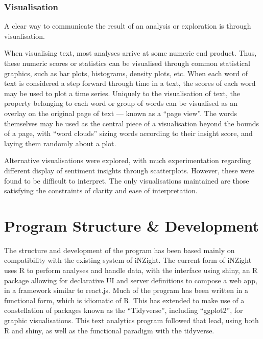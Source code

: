 \documentclass[11pt, a4paper, twoside, titlepage]{report}
\begin{document}
\subsection{Visualisation}\label{sec:visualisation-1}

A clear way to communicate the result of an analysis or exploration is
through visualisation.

When visualising text, most analyses arrive at some numeric end
product. Thus, these numeric scores or statistics can be visualised
through common statistical graphics, such as bar plots, histograms,
density plots, etc. When each word of text is considered a step
forward through time in a text, the scores of each word may be used to
plot a time series. Uniquely to the visualisation of text, the
property belonging to each word or group of words can be visualised as
an overlay on the original page of text --- known as a ``page view''.
The words themselves may be used as the central piece of a
visualisation beyond the bounds of a page, with ``word clouds'' sizing
words according to their insight score, and laying them randomly about
a plot.

Alternative visualisations were explored, with much experimentation
regarding different display of sentiment insights through
scatterplots. However, these were found to be difficult to interpret.
The only visualisations maintained are those satisfying the
constraints of clarity and ease of interpretation.

\chapter{Program Structure \& Development}\label{cha:program-structure}

The structure and development of the program has been based mainly on
compatibility with the existing system of iNZight. The current form of
iNZight uses R to perform analyses and handle data, with the interface
using shiny, an R package allowing for declarative UI and server
definitions to compose a web app, in a framework similar to
react.js\autocite{chang19}. Much of the program has been written in a
functional form, which is idiomatic of R. This has extended to make
use of a constellation of packages known as the
``Tidyverse''\autocite{wickham17tidy}, including
``ggplot2''\autocite{wickham16ggplt}, for graphic visualisations. This
text analytics program followed that lead, using both R and shiny, as
well as the functional paradigm with the tidyverse.
\end{document}
